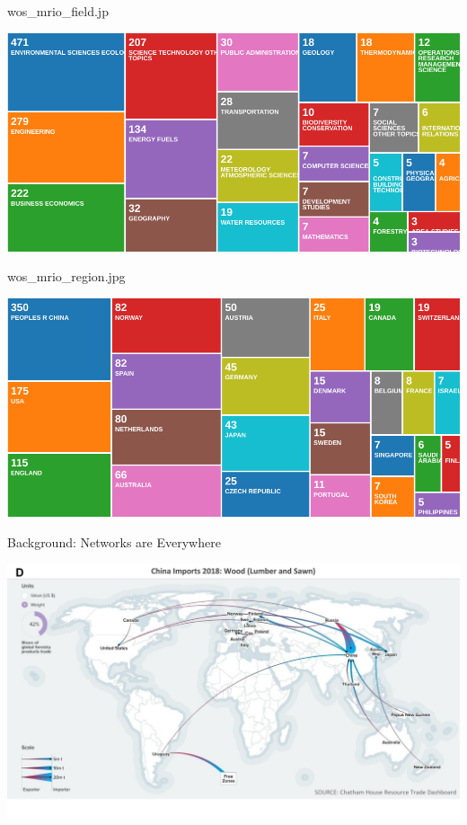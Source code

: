 \documentclass[ignorenonframetext,]{beamer}
\begin{document}
\begin{frame}{wos\_mrio\_field.jp}
\protect\hypertarget{wos_mrio_field.jp}{}

\begin{center}\includegraphics[width=0.5\linewidth]{images/wos_mrio_field} \end{center}

\end{frame}

\begin{frame}{wos\_mrio\_region.jpg}
\protect\hypertarget{wos_mrio_region.jpg}{}

\begin{center}\includegraphics[width=0.5\linewidth]{images/wos_mrio_region} \end{center}

\end{frame}

\begin{frame}{Background: Networks are Everywhere}
\protect\hypertarget{background-networks-are-everywhere}{}

\begin{center}\includegraphics[width=0.5\linewidth]{images/resourcetrade_network} \end{center}

\end{frame}
\end{document}
